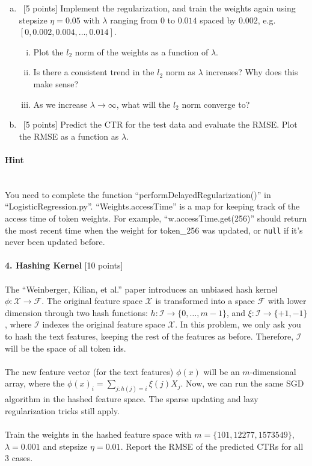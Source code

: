 \documentclass[12pt]{article}
\begin{document}
{\begin{enumerate}[(a)]
  \item ~[5 points] Implement the regularization, and train the weights again using stepsize
    $\eta = 0.05$ with $\lambda$ ranging from $0$ to $0.014$ spaced by $0.002$,
    e.g. $[0, 0.002, 0.004, \ldots, 0.014]$.
    \begin{enumerate}[i.]
      \item Plot the $l_2$ norm of the weights as a function of $\lambda$.
      \item Is there a consistent trend in the $l_2$ norm as $\lambda$ increases? Why does this make sense?
      \item As we increase $\lambda \rightarrow \infty$, what will the $l_2$
        norm converge to?
    \end{enumerate}

  \item ~[5 points] Predict the CTR for the test data and evaluate the RMSE.
    Plot the RMSE as a function as $\lambda$.
\end{enumerate}

\paragraph{Hint} ~\\
You need to complete the function ``performDelayedRegularization()'' in ``LogisticRegression.py''. ``Weights.accessTime'' is a map for keeping track of the access time of token weights. For example, ``w.accessTime.get(256)'' should return the most recent time when the weight for token\_256 was updated, or \texttt{null} if it's never been updated before.
\\
\\{\bf 4. Hashing Kernel} [10 points]
\\
\\The ``Weinberger, Kilian, et al.'' paper introduces an unbiased hash kernel $\phi: \mathcal{X} \rightarrow \mathcal{F}$.  The original feature space $\mathcal{X}$ is transformed into a space $\mathcal{F}$ with lower dimension through two hash functions: $h: \mathcal{I} \rightarrow \{0, \dots, m-1\}$, and $\xi: \mathcal{I} \rightarrow \{+1, -1\}$, where $\mathcal{I}$ indexes the original feature space $\mathcal{X}$. In this problem, we only ask you to hash the text features, keeping the rest of the features as before. Therefore, $\mathcal{I}$ will be the space of all token ids. 
\\
\\The new feature vector (for the text features) $\phi(x)$ will be an $m$-dimensional array, where the $\phi(x)_i = \sum_{j : h(j) = i} \xi(j) X_j$. Now, we can run the same SGD algorithm in the hashed feature space. The sparse updating and lazy regularization tricks still apply.
\\
\\ Train the weights in the hashed feature space with $m = \{101, 12277, 1573549\}$, $\lambda = 0.001$ and stepsize $\eta = 0.01$. Report the RMSE of the predicted CTRs for all 3 cases. 

}
\end{document}

